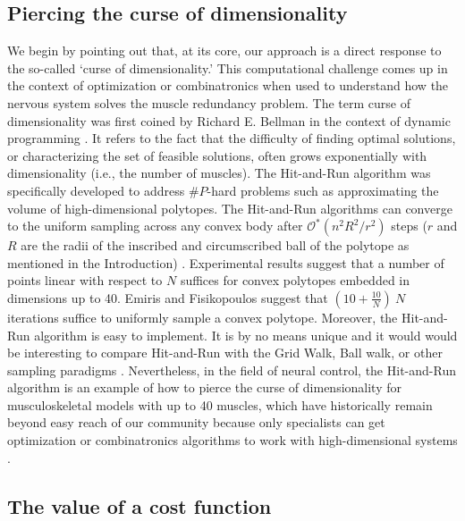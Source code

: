 \subsection*{Piercing the curse of dimensionality}
We begin by pointing out that, at its core, our approach is a direct response to the so-called `curse of dimensionality.'  This computational challenge comes up in the context of optimization \cite{todorov2002optimal} or combinatronics \cite{valero-cuevas2015fundamentals} when used to understand how the nervous system solves the muscle redundancy problem. The term curse of dimensionality was first coined by Richard E. Bellman  in the context of dynamic programming \cite{bellman1957dynamic}. It refers to the fact that the difficulty of finding optimal  solutions,  or characterizing the set of feasible solutions, often grows exponentially with  dimensionality (i.e., the number of muscles). The Hit-and-Run algorithm was specifically developed to address $\#P$-hard problems such as approximating the volume of high-dimensional polytopes\cite{Dyer}. The Hit-and-Run algorithms can converge to the uniform sampling across any convex body \cite{smith1984efficient} after $\mathcal{O}^*(n^2R^2/r^2)$ steps ($r$ and $R$ are the radii of the inscribed and circumscribed ball of the polytope as mentioned in the Introduction) \cite{Dyer, Lovasz}.  Experimental results  suggest that a number of points linear with respect to $N$  suffices for convex polytopes embedded in dimensions up to 40.  Emiris and Fisikopoulos \cite{emiris2013efficient} suggest that  $(10 + \frac{10}{N})~N$ iterations suffice to uniformly sample a convex polytope. Moreover, the Hit-and-Run algorithm is easy to implement. It is by no means unique and it would would be interesting to compare Hit-and-Run with the Grid Walk, Ball walk, or other sampling paradigms \cite{Vempala}. Nevertheless, in the field of neural control, the Hit-and-Run algorithm is an example of how to pierce the curse of dimensionality for musculoskeletal models with up to 40 muscles, which have historically remain beyond easy reach of our community because only specialists  can get optimization  or combinatronics algorithms to work with high-dimensional systems  \cite{valero-cuevas2009computational,sohn2013cat_bounding_box,Valero-Cuevas2015high-dimensional,todorov2002optimal}.

\subsection*{The value of a cost function}


